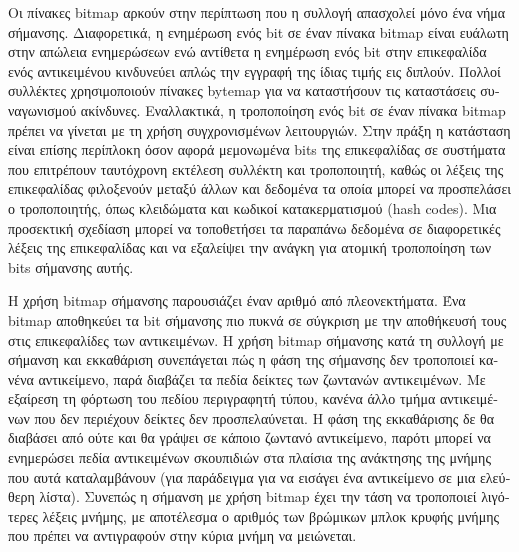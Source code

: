 \begin{greek}
Οι πίνακες bitmap αρκούν στην περίπτωση που η συλλογή απασχολεί
μόνο ένα νήμα σήμανσης. Διαφορετικά, η ενημέρωση ενός bit σε
έναν πίνακα bitmap είναι ευάλωτη στην απώλεια ενημερώσεων ενώ
αντίθετα η ενημέρωση ενός bit στην επικεφαλίδα ενός αντικειμένου
κινδυνεύει απλώς την εγγραφή της ίδιας τιμής εις διπλούν. Πολλοί
συλλέκτες χρησιμοποιούν πίνακες bytemap για να καταστήσουν τις
καταστάσεις συναγωνισμού ακίνδυνες. Εναλλακτικά, η τροποποίηση
ενός bit σε έναν πίνακα bitmap πρέπει να γίνεται με τη χρήση
συγχρονισμένων λειτουργιών. Στην πράξη η κατάσταση είναι επίσης
περίπλοκη όσον αφορά μεμονωμένα bits της επικεφαλίδας σε συστήματα
που επιτρέπουν ταυτόχρονη εκτέλεση συλλέκτη και τροποποιητή, καθώς
οι λέξεις της επικεφαλίδας φιλοξενούν μεταξύ άλλων και δεδομένα
τα οποία μπορεί να προσπελάσει ο τροποποιητής, όπως κλειδώματα
και κωδικοί κατακερματισμού (hash codes). Μια προσεκτική σχεδίαση
μπορεί να τοποθετήσει τα παραπάνω δεδομένα σε διαφορετικές
λέξεις της επικεφαλίδας και να εξαλείψει την ανάγκη για ατομική
τροποποίηση των bits σήμανσης αυτής.

Η χρήση bitmap σήμανσης παρουσιάζει έναν αριθμό από πλεονεκτήματα.
Ένα bitmap αποθηκεύει τα bit σήμανσης πιο πυκνά σε σύγκριση με
την αποθήκευσή τους στις επικεφαλίδες των αντικειμένων. Η χρήση
bitmap σήμανσης κατά τη συλλογή με σήμανση και εκκαθάριση συνεπάγεται
πώς η φάση της σήμανσης δεν τροποποιεί κανένα αντικείμενο, παρά
διαβάζει τα πεδία δείκτες των ζωντανών αντικειμένων. Με εξαίρεση
τη φόρτωση του πεδίου περιγραφητή τύπου, κανένα άλλο τμήμα αντικειμένων
που δεν περιέχουν δείκτες δεν προσπελαύνεται. Η φάση της εκκαθάρισης
δε θα διαβάσει από ούτε και θα γράψει σε κάποιο ζωντανό αντικείμενο,
παρότι μπορεί να ενημερώσει πεδία αντικειμένων σκουπιδιών στα 
πλαίσια της ανάκτησης της μνήμης που αυτά καταλαμβάνουν (για παράδειγμα
για να εισάγει ένα αντικείμενο σε μια ελεύθερη λίστα). Συνεπώς 
η σήμανση με χρήση bitmap έχει την τάση να τροποποιεί λιγότερες 
λέξεις μνήμης, με αποτέλεσμα ο αριθμός των βρώμικων μπλοκ κρυφής
μνήμης που πρέπει να αντιγραφούν στην κύρια μνήμη να μειώνεται.


\end{greek}
